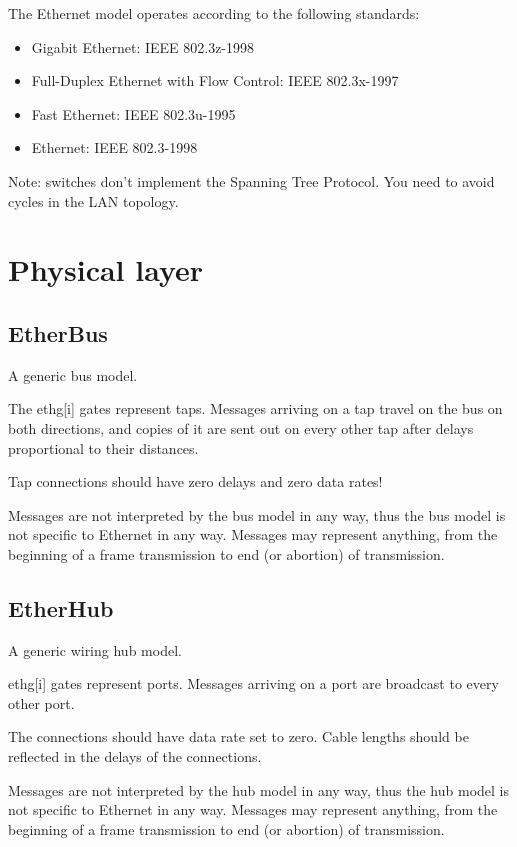 The Ethernet model operates according to the following standards:

\begin{itemize}
  \item Gigabit Ethernet: IEEE 802.3z-1998
  \item Full-Duplex Ethernet with Flow Control: IEEE 802.3x-1997
  \item Fast Ethernet: IEEE 802.3u-1995
  \item Ethernet: IEEE 802.3-1998
\end{itemize}

Note: switches don't implement the Spanning Tree Protocol. You need to
avoid cycles in the LAN topology.

\section{Physical layer}

\subsection{EtherBus}

A generic bus model.

The ethg[i] gates represent taps. Messages arriving on a tap
travel on the bus on both directions, and copies of it are sent out
on every other tap after delays proportional to their distances.

Tap connections should have zero delays and zero data rates!

Messages are not interpreted by the bus model in any way, thus the bus
model is not specific to Ethernet in any way. Messages may
represent anything, from the beginning of a frame transmission to
end (or abortion) of transmission.


\subsection{EtherHub}

A generic wiring hub model.

ethg[i] gates represent ports. Messages arriving on a port are broadcast
to every other port.

The connections should have data rate set to zero. Cable lengths
should be reflected in the delays of the connections.

Messages are not interpreted by the hub model in any way, thus the hub
model is not specific to Ethernet in any way. Messages may
represent anything, from the beginning of a frame transmission to
end (or abortion) of transmission.


